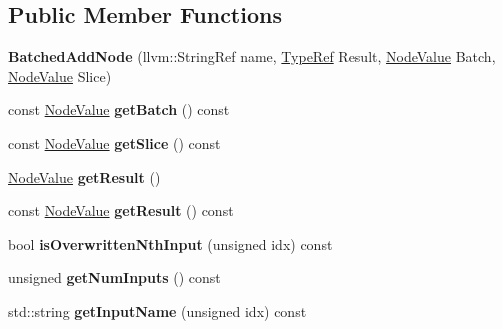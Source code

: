 \subsection*{Public Member Functions}
\begin{DoxyCompactItemize}
\item 
\mbox{\label{classglow_1_1_batched_add_node_a4f06652af0977b2faccf0562abe731d6}} 
{\bfseries Batched\+Add\+Node} (llvm\+::\+String\+Ref name, \hyperlink{structglow_1_1_type}{Type\+Ref} Result, \hyperlink{structglow_1_1_node_value}{Node\+Value} Batch, \hyperlink{structglow_1_1_node_value}{Node\+Value} Slice)
\item 
\mbox{\label{classglow_1_1_batched_add_node_a811c53c40ed596611486c3d6d0014bbd}} 
const \hyperlink{structglow_1_1_node_value}{Node\+Value} {\bfseries get\+Batch} () const
\item 
\mbox{\label{classglow_1_1_batched_add_node_a401965023fc1fb72c33f719a1f0f17a8}} 
const \hyperlink{structglow_1_1_node_value}{Node\+Value} {\bfseries get\+Slice} () const
\item 
\mbox{\label{classglow_1_1_batched_add_node_a57dc635ecff491e5990f4309b8e7cfc2}} 
\hyperlink{structglow_1_1_node_value}{Node\+Value} {\bfseries get\+Result} ()
\item 
\mbox{\label{classglow_1_1_batched_add_node_a24787c087cd89f756ee04556d4d6c55f}} 
const \hyperlink{structglow_1_1_node_value}{Node\+Value} {\bfseries get\+Result} () const
\item 
\mbox{\label{classglow_1_1_batched_add_node_ac9f4b521066f2f12defffd4399568d86}} 
bool {\bfseries is\+Overwritten\+Nth\+Input} (unsigned idx) const
\item 
\mbox{\label{classglow_1_1_batched_add_node_a05cd6679ae36aaa2c2fe4e461959d276}} 
unsigned {\bfseries get\+Num\+Inputs} () const
\item 
\mbox{\label{classglow_1_1_batched_add_node_acaa27fcaab86a4be2a8cfce4b8f7d2a8}} 
std\+::string {\bfseries get\+Input\+Name} (unsigned idx) const

\end{DoxyCompactItemize}
